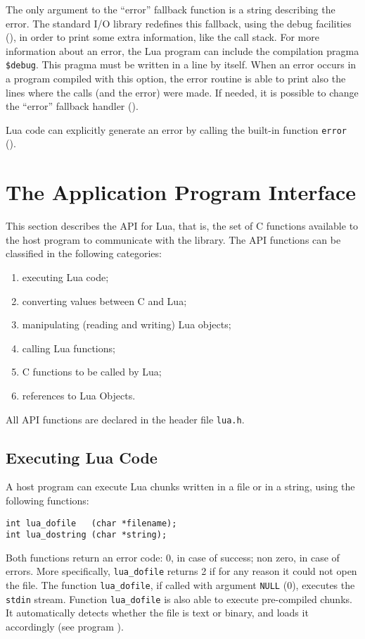 The only argument to the ``error'' fallback function is a string
describing the error.
The standard I/O library redefines this fallback,
using the debug facilities (),
in order to print some extra information,
like the call stack.
For more information about an error,
the Lua program can include the compilation pragma \verb'$debug'.
\label{pragma}
This pragma must be written in a line by itself.
When an error occurs in a program compiled with this option,
the error routine is able to print also the lines where the calls
(and the error) were made.
If needed, it is possible to change the ``error'' fallback handler
().

Lua code can explicitly generate an error by calling the built-in
function \verb'error' ().


\section{The Application Program Interface}

This section describes the API for Lua, that is,
the set of C functions available to the host program to communicate
with the library.
The API functions can be classified in the following categories:
\begin{enumerate}
\item executing Lua code;
\item converting values between C and Lua;
\item manipulating (reading and writing) Lua objects;
\item calling Lua functions;
\item C functions to be called by Lua;
\item references to Lua Objects.
\end{enumerate}
All API functions are declared in the header file \verb'lua.h'.

\subsection{Executing Lua Code}
A host program can execute Lua chunks written in a file or in a string,
using the following functions:
\begin{verbatim}
int lua_dofile   (char *filename);
int lua_dostring (char *string);
\end{verbatim}
Both functions return an error code:
0, in case of success; non zero, in case of errors.
More specifically, \verb'lua_dofile' returns 2 if for any reason
it could not open the file.
The function \verb'lua_dofile', if called with argument \verb'NULL' (0),
executes the {\tt stdin} stream.
Function \verb'lua_dofile' is also able to execute pre-compiled chunks.
It automatically detects whether the file is text or binary,
and loads it accordingly (see program ).

